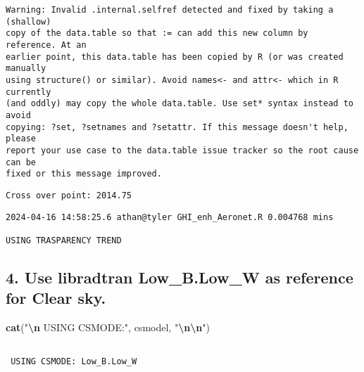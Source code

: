 \documentclass[
  10pt,
  a4paper,oneside]{article}
\newenvironment{Shaded}{\begin{snugshade}}{\end{snugshade}}
\newcommand{\FunctionTok}[1]{\textcolor[rgb]{0.13,0.29,0.53}{\textbf{#1}}}
\newcommand{\NormalTok}[1]{#1}
\newcommand{\SpecialCharTok}[1]{\textcolor[rgb]{0.81,0.36,0.00}{\textbf{#1}}}
\newcommand{\StringTok}[1]{\textcolor[rgb]{0.31,0.60,0.02}{#1}}
\begin{document}
\begin{verbatim}
Warning: Invalid .internal.selfref detected and fixed by taking a (shallow)
copy of the data.table so that := can add this new column by reference. At an
earlier point, this data.table has been copied by R (or was created manually
using structure() or similar). Avoid names<- and attr<- which in R currently
(and oddly) may copy the whole data.table. Use set* syntax instead to avoid
copying: ?set, ?setnames and ?setattr. If this message doesn't help, please
report your use case to the data.table issue tracker so the root cause can be
fixed or this message improved.
\end{verbatim}

\begin{verbatim}
Cross over point: 2014.75 
\end{verbatim}

\begin{verbatim}
2024-04-16 14:58:25.6 athan@tyler GHI_enh_Aeronet.R 0.004768 mins

USING TRASPARENCY TREND
\end{verbatim}

\hypertarget{use-libradtran-low_b.low_w-as-reference-for-clear-sky.}{%
\subsection{\texorpdfstring{4. Use libradtran \textbf{Low\_B.Low\_W} as reference for Clear sky.}{4. Use libradtran Low\_B.Low\_W as reference for Clear sky.}}\label{use-libradtran-low_b.low_w-as-reference-for-clear-sky.}}

\begin{Shaded}
\begin{Highlighting}[]
\FunctionTok{cat}\NormalTok{(}\StringTok{"}\SpecialCharTok{\textbackslash{}n}\StringTok{ USING CSMODE:"}\NormalTok{, csmodel, }\StringTok{"}\SpecialCharTok{\textbackslash{}n\textbackslash{}n}\StringTok{"}\NormalTok{)}
\end{Highlighting}
\end{Shaded}

\begin{verbatim}

 USING CSMODE: Low_B.Low_W 
\end{verbatim}
\end{document}
